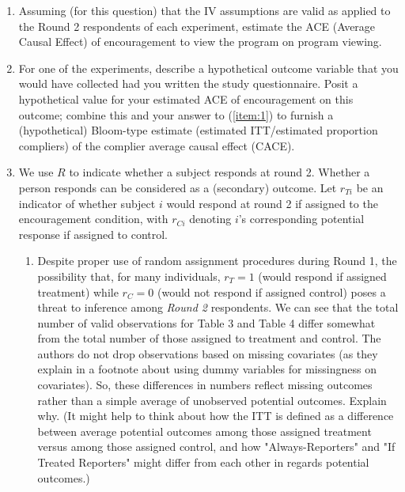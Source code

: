 \documentclass{article}
\begin{document}
\begin{enumerate}
\item \label{item:1}Assuming (for this question) that the IV assumptions are
     valid as applied to the Round 2 respondents of each experiment, estimate
     the ACE (Average Causal Effect) of encouragement to view the program on
     program viewing.
\item For one of the experiments, describe a hypothetical outcome variable that
     you would have collected had you written the study questionnaire. Posit a
     hypothetical value for your estimated ACE of encouragement on this outcome;
     combine this and your answer to (\ref{item:1}) to furnish a (hypothetical)
     Bloom-type estimate (estimated ITT/estimated proportion compliers) of the
     complier average causal effect (CACE).

\item We use $R$ to indicate whether a subject responds at round 2. Whether a
	person responds can be considered as a (secondary) outcome. Let
	$r_{Ti}$ be an indicator of whether subject $i$ would respond at round
	2 if assigned to the encouragement condition, with $r_{Ci}$ denoting
	$i$'s corresponding potential response if assigned to control.

     \begin{enumerate}

  \item Despite proper use of random assignment procedures during Round 1, the
       possibility that, for many individuals, $r_{T}=1$ (would respond if
               assigned treatment) while $r_{C}=0$ (would not respond if
               assigned control) poses a threat to inference among
               \textit{Round 2} respondents. We can see that the total number
               of valid observations for Table 3 and Table 4 differ somewhat
               from the total number of those assigned to treatment and
               control. The authors do not drop observations based on missing
               covariates (as they explain in a footnote about using dummy
               variables for missingness on covariates). So, these differences
               in numbers reflect missing outcomes rather than a simple average
               of unobserved potential outcomes. Explain why. (It might help to
               think about how the ITT is defined as a difference between
               average potential outcomes among those assigned treatment versus
               among those assigned control, and how  "Always-Reporters" and
               "If Treated Reporters" might differ from each other in regards
               potential outcomes.)


\end{enumerate}
\end{enumerate}
\end{document}
